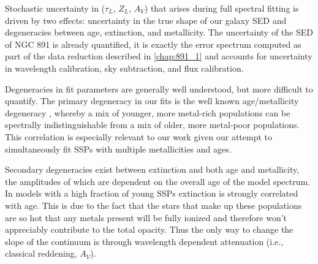 Stochastic uncertainty in ($\tau_L$, $Z_L$, $A_V$) that arises during
full spectral fitting is driven by two effects: uncertainty in the
true shape of our galaxy SED and degeneracies between age, extinction,
and metallicity. The uncertainty of the SED of NGC 891 is already
quantified, it is exactly the error spectrum computed as part of the
data reduction described in \ref{chap:891_1} and accounts for
uncertainty in wavelength calibration, sky subtraction, and flux
calibration.


Degeneracies in fit parameters are generally well understood, but more
difficult to quantify. The primary degeneracy in our fits is the well
known age/metallicity degeneracy \citep[see, for
  example,][]{Oconnel76,Aaronson78,Worthey94,dePaz02}, whereby a mix
of younger, more metal-rich populations can be spectrally
indistinguishable from a mix of older, more metal-poor
populations. This correlation is especially relevant to our work given
our attempt to simultaneously fit SSPs with multiple metallicities and
ages.

Secondary degeneracies exist between extinction and both age and
metallicity, the amplitudes of which are dependent on the overall age
of the model spectrum. In models with a high fraction of young SSPs
extinction is strongly correlated with age. This is due to the fact
that the stars that make up these populations are so hot that any
metals present will be fully ionized and therefore won't appreciably
contribute to the total opacity. Thus the only way to change the slope
of the continuum is through wavelength dependent attenuation (i.e.,
classical reddening, $A_V$). 

